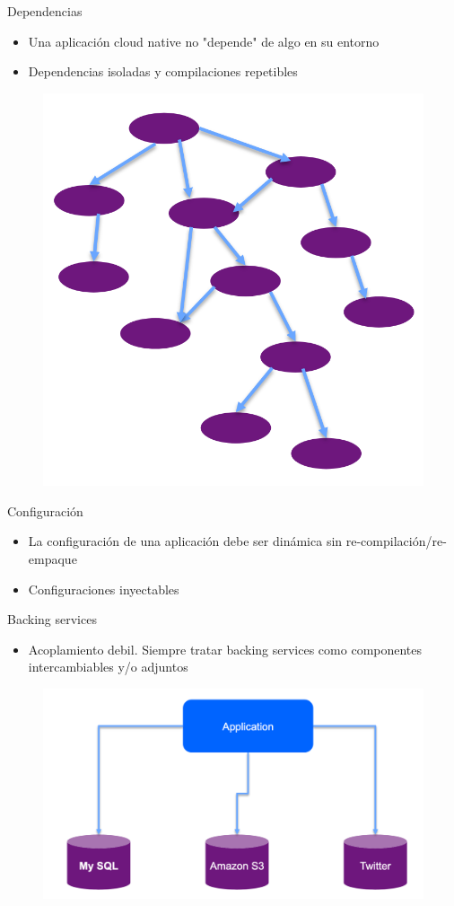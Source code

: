 \documentclass[aspectratio=169]{beamer}
\begin{document}
\begin{frame}{Dependencias}
\begin{itemize}
	\item Una aplicación cloud native no "depende" de algo en su entorno
	\item Dependencias isoladas y compilaciones repetibles
\end{itemize}

\begin{figure}
	\centering
	\includegraphics[width=0.4\linewidth]{Images/maven}
\end{figure}
\end{frame}


\begin{frame}{Configuración}
\begin{itemize}
	\item La configuración de una aplicación debe ser dinámica sin re-compilación/re-empaque
	\item Configuraciones inyectables
\end{itemize}
\end{frame}


\begin{frame}{Backing services}
\begin{itemize}
	\item Acoplamiento debil. Siempre tratar backing services como componentes intercambiables y/o adjuntos
\end{itemize}

\begin{figure}
	\centering
	\includegraphics[width=0.5\linewidth]{Images/backing}
\end{figure}
\end{frame}
\end{document}
